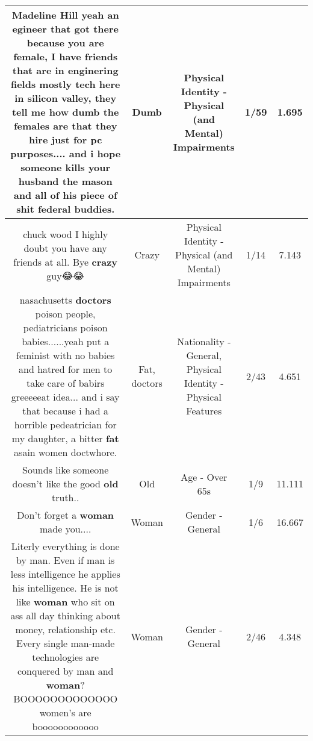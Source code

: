 \documentclass[11pt]{article}
\newlength\mylength
\begin{document}
\begin{center}
\begin{longtable}{|C{.65\mylength}|C{.30\mylength}|C{.12\mylength}|C{.12\mylength}|C{.12\mylength}|}
  \small Madeline Hill yeah an egineer that got there because you are female, I have friends that are in enginering fields mostly tech here in silicon valley, they tell me how \textbf{dumb} the females are that they hire just for pc purposes.... and i hope someone kills your husband the mason and all of his piece of shit federal buddies.\normalsize   & Dumb & Physical Identity - Physical (and Mental) Impairments & 1/59 & 1.695 \\  \hline
  \small chuck wood I highly doubt you have any friends at all. Bye \textbf{crazy} guy😂😂\normalsize   & Crazy & Physical Identity - Physical (and Mental) Impairments & 1/14 & 7.143 \\  \hline
  \small nasachusetts \textbf{doctors} poison people, pediatricians poison babies......yeah put a feminist with no babies and hatred for men to take care of babirs greeeeeat idea... and i say that because i had a horrible pedeatrician for my daughter, a bitter \textbf{fat} asain women doctwhore.\normalsize   & Fat, doctors & Nationality - General, Physical Identity - Physical Features & 2/43 & 4.651 \\  \hline
  \small Sounds like someone doesn't like the good \textbf{old} truth..\normalsize   & Old & Age - Over 65s & 1/9 & 11.111 \\  \hline
  \small Don't forget a \textbf{woman} made you....\normalsize   & Woman & Gender - General & 1/6 & 16.667 \\  \hline
  \small Literly everything is done by man. Even if man is less intelligence he applies his intelligence. He is not like \textbf{woman} who sit on ass all day thinking about money, relationship etc. Every single man-made technologies are conquered by man and \textbf{woman}? BOOOOOOOOOOOOO women's are boooooooooooo\normalsize   & Woman & Gender - General & 2/46 & 4.348 \\  \hline

\end{longtable}
\end{center}
\end{document}
